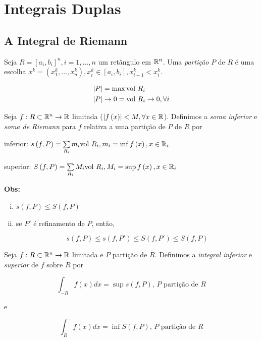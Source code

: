 \documentclass{book}
\begin{document}
\chapter{Integrais Duplas} \label{chap06}

\section{A Integral de Riemann} \label{sec27}

\begin{defn}
Seja $R = \left[ {a_i ,b_i } \right]^n ,i = 1,...,n$ um ret\^angulo em $\mathbb{R}^n$. Uma \textit{parti\c c\~ao} $P$ de $R$ \'e uma escolha $x^k  = \left( {x_1^k ,...,x_n^k } \right),x_i^k  \in \left[ {a_i ,b_i } \right],x_{i - 1}^k  < x_i^k$.

\[
\begin{gathered}
  \left| P \right| = \max {\text{vol }}R_i  \hfill \\
  \left| P \right| \to 0 = {\text{vol }}R_i  \to 0,\forall i \hfill \\
\end{gathered}
\]

\end{defn}

\begin{defn}
Seja $f:R \subset \mathbb{R}^n  \to \mathbb{R}$ limitada ($\left| {f\left( x \right)} \right| < M,\forall x \in \mathbb{R}$). Definimos a \textit{soma inferior} e \textit{soma de Riemann} para $f$ relativa a uma parti\c c\~ao de $P$ de $R$ por

inferior: $s\left( {f,P} \right) = \sum\limits_{R_i }^{} {m_i {\text{vol }}R_i } ,m_i  = \inf f\left( x \right),x \in \mathbb{R}_i$

superior: $S\left( {f,P} \right) = \sum\limits_{R_i }^{} {M_i {\text{vol }}R_i } ,M_i  = \sup f\left( x \right),x \in \mathbb{R}_i$
\end{defn}

\textbf{Obs:}

\begin{enumerate}[(i)]
  \item $s\left( {f,P} \right) \leqslant S\left( {f,P} \right)$
  \item se $P'$ \'e refinamento de $P$, ent\~ao,

\[
s\left( {f,P} \right) \leqslant s\left( {f,P'} \right) \leqslant S\left( {f,P'} \right) \leqslant S\left( {f,P} \right)
\]

\end{enumerate}

\begin{defn}
Seja $f:R \subset \mathbb{R}^n \to \mathbb{R}$ limitada e $P$ parti\c c\~ao de $R$. Definimos a \textit{integral inferior} e \textit{superior} de $f$ sobre $R$ por

\[
\int_{-R} {f(x)dx} = \sup s(f,P),\,P \text{ parti\c c\~ao de } R
\]

e

\[
\int_{R}^- {f(x)dx} = \inf S(f,P),\,P \text{ parti\c c\~ao de } R
\]

\end{defn}
\end{document}

